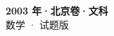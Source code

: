\documentclass[zihao=-4, a4paper]{ctexart}
\begin{document}
\begin{center}
  {\Large\bfseries 2003 年·北京卷·文科}\\[4pt]
  {\large 数学 · 试题版}
\end{center}
\medskip
{}

\end{document}

